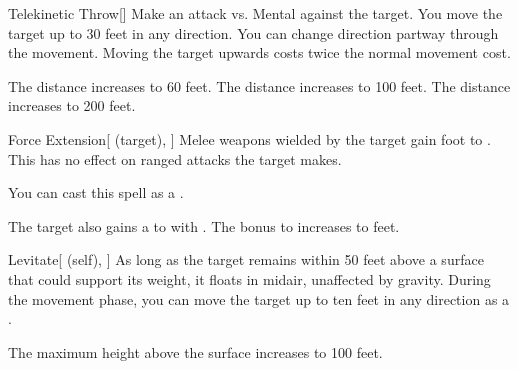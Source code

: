 \lowercase{\hypertarget{spell:Telekinetic Throw}{}}\label{spell:Telekinetic Throw}
\begin{freeability}[Rank 1]{\hypertarget{spell:Telekinetic Throw}{Telekinetic Throw}}[]
Make an attack vs. Mental against the target.
\hit You move the target up to 30 feet in any direction.
You can change direction partway through the movement.
Moving the target upwards costs twice the normal movement cost.

\rankline
{} The distance increases to 60 feet.
 The distance increases to 100 feet.
 The distance increases to 200 feet.
\end{freeability}
\vspace{0.25em}



\lowercase{\hypertarget{spell:Force Extension}{}}\label{spell:Force Extension}
\begin{attuneability}[Rank 3]{\hypertarget{spell:Force Extension}{Force Extension}}[ (target), ]
Melee weapons wielded by the target gain  foot  to .
This has no effect on ranged attacks the target makes.

You can cast this spell as a .

\rankline
{} The target also gains a   to  with .
 The bonus to  increases to  feet.
\end{attuneability}
\vspace{0.25em}



\lowercase{\hypertarget{spell:Levitate}{}}\label{spell:Levitate}
\begin{attuneability}[Rank 5]{\hypertarget{spell:Levitate}{Levitate}}[ (self), ]
As long as the target remains within 50 feet above a surface that could support its weight, it floats in midair, unaffected by gravity.
During the movement phase, you can move the target up to ten feet in any direction as a .

\rankline
{} The maximum height above the surface increases to 100 feet.
\end{attuneability}
\vspace{0.25em}



